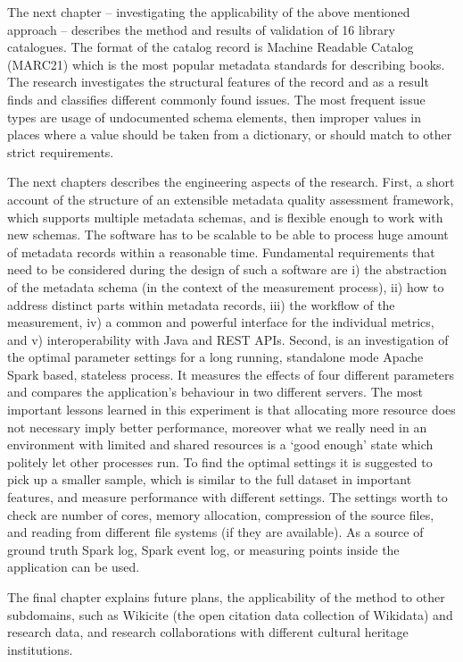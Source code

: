 \documentclass{article}
\begin{document}
The next chapter -- investigating the applicability of the above mentioned approach -- describes the method and results of validation of 16 library catalogues. The format of the catalog record is Machine Readable Catalog (MARC21) which is the most popular metadata standards for describing books. The research investigates the structural features of the record and as a result finds and classifies different commonly found issues. The most frequent issue types are usage of undocumented schema elements, then improper values in places where a value should be taken from a dictionary, or should match to other strict requirements.

The next chapters describes the engineering aspects of the research. First, a short account of the structure of an extensible metadata quality assessment framework, which supports multiple metadata schemas, and is flexible enough to work with new schemas. The software has to be scalable to be able to process huge amount of metadata records within a reasonable time. Fundamental requirements that need to be considered during the design of such a software are i) the abstraction of the metadata schema (in the context of the measurement process), ii) how to address distinct parts within metadata records, iii) the workflow of the measurement, iv) a common and powerful interface for the individual metrics, and v) interoperability with Java and REST APIs. Second, is an investigation of the optimal parameter settings for a long running, standalone mode Apache Spark based, stateless process. It measures the effects of four different parameters and compares the application's behaviour in two different servers. The most important lessons learned in this experiment is that allocating more resource does not necessary imply better performance, moreover what we really need in an environment with limited and shared resources is a `good enough' state which politely let other processes run. To find the optimal settings it is suggested to pick up a smaller sample, which is similar to the full dataset in important features, and measure performance with different settings. The settings worth to check are number of cores, memory allocation, compression of the source files, and reading from different file systems (if they are available). As a source of ground truth Spark log, Spark event log, or measuring points inside the application can be used.

The final chapter explains future plans, the applicability of the method to other subdomains, such as Wikicite (the open citation data collection of Wikidata) and research data, and research collaborations with different cultural heritage institutions.
\end{document}
